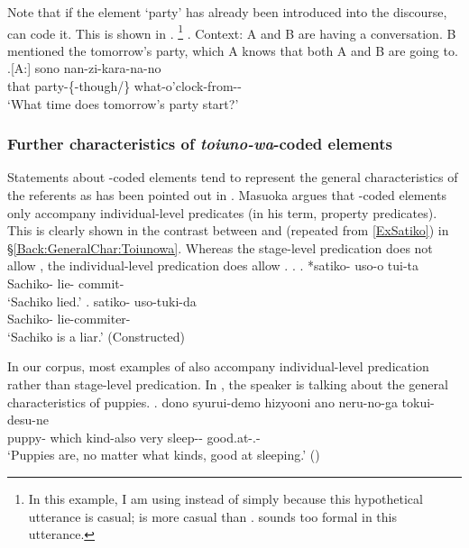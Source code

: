 Note that if the element `party' has already been introduced into the discourse,  can code it.
This is shown in \Next[A].%
	\footnote{
	In this example, I am using  instead of 
	simply because this hypothetical utterance is casual;
	 is more casual than .
	 sounds too formal in this utterance.
	}
\ex. \label{Party}Context: A and B are having a conversation. B mentioned the tomorrow's party, which A knows that both A and B are going to.
	\ag.[A:] sono  nan-zi-kara-na-no \\
		that party-\{-though/\} what-o'clock-from-- \\
		`What time does tomorrow's party start?' 


\subsubsection{Further characteristics of \textit{toiuno-wa}-coded elements}\label{Par:Topic:Toiunowa:Other}

Statements about -coded elements tend to represent the general characteristics of the referents
as has been pointed out in .
Masuoka argues that -coded elements only accompany individual-level predicates (in his term, property predicates).
This is clearly shown in the contrast between \Next[a] and \Next[b] (repeated from \ref{ExSatiko}) in \S \ref{Back:GeneralChar:Toiunowa}.
Whereas the stage-level predication \Next[a] does not allow ,
the individual-level predication \Next[b] does allow .
%
\ex.
\ag. *satiko- uso-o tui-ta \\
     Sachiko- lie- commit- \\
     `Sachiko lied.'
     \hfill{\cite[p.~96]{masuoka12}}
\bg. satiko- uso-tuki-da \\
     Sachiko- lie-commiter- \\
     `Sachiko is a liar.'
     \hfill{(Constructed)}

In our corpus,
most examples of  also accompany individual-level predication
rather than stage-level predication.
In \Next,
the speaker is talking about the general characteristics of puppies.
%
\exg.  dono syurui-demo hizyooni ano neru-no-ga tokui-desu-ne \\
 puppy- which kind-also very  sleep-- good.at-.- \\
 `Puppies are, no matter what kinds, good at sleeping.'
 \hfill{()}

